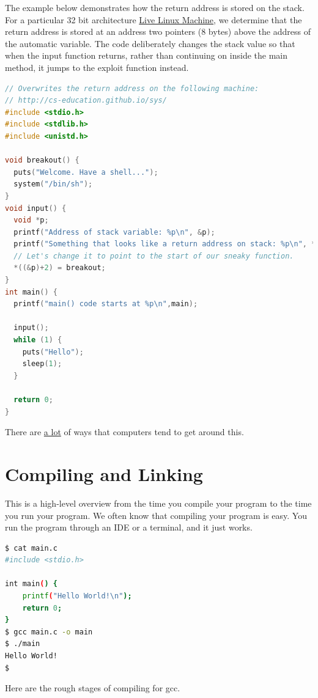 The example below demonstrates how the return address is stored on the stack.
For a particular 32 bit architecture \href{http://cs-education.github.io/sys/}{Live Linux Machine}, we determine that the return address is stored at an address two pointers (8 bytes) above the address of the automatic variable.
The code deliberately changes the stack value so that when the input function returns, rather than continuing on inside the main method, it jumps to the exploit function instead.

\begin{lstlisting}[language=C]
// Overwrites the return address on the following machine:
// http://cs-education.github.io/sys/
#include <stdio.h>
#include <stdlib.h>
#include <unistd.h>

void breakout() {
  puts("Welcome. Have a shell...");
  system("/bin/sh");
}
void input() {
  void *p;
  printf("Address of stack variable: %p\n", &p);
  printf("Something that looks like a return address on stack: %p\n", *((&p)+2));
  // Let's change it to point to the start of our sneaky function.
  *((&p)+2) = breakout;
}
int main() {
  printf("main() code starts at %p\n",main);

  input();
  while (1) {
    puts("Hello");
    sleep(1);
  }

  return 0;
}
\end{lstlisting}

There are \href{https://en.wikipedia.org/wiki/Stack_buffer_overflow}{a lot} of ways that computers tend to get around this.


\section{Compiling and Linking}

This is a high-level overview from the time you compile your program to the time you run your program.
We often know that compiling your program is easy.
You run the program through an IDE or a terminal, and it just works.

\begin{lstlisting}[language=bash]
$ cat main.c
#include <stdio.h>

int main() {
    printf("Hello World!\n");
    return 0;
}
$ gcc main.c -o main
$ ./main
Hello World!
$
\end{lstlisting}

Here are the rough stages of compiling for gcc.

